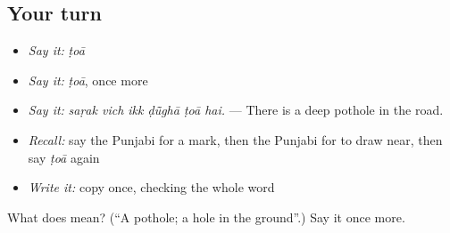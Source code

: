 \subsection*{Your turn}
\begin{itemize}
\raggedright
  \item \emph{Say it:} \emph{ṭoā}
  \item \emph{Say it:} \emph{ṭoā}, once more
  \item \emph{Say it:} \emph{saṛak vich ikk ḍū̃ghā ṭoā hai.} — There is a deep pothole in the road.
  \item \emph{Recall:} say the Punjabi for a mark, then the Punjabi for to draw near, then say \emph{ṭoā} again
  \item \emph{Write it:} copy \textbf{} once, checking the whole word
\end{itemize}

\begin{tcolorbox}[breakable,colback=teal!4,colframe=teal!35!black,title={Before you move on}]
What does  mean? (\textquotedblleft{}A pothole; a hole in the ground\textquotedblright{}.) Say it once more.
\end{tcolorbox}
